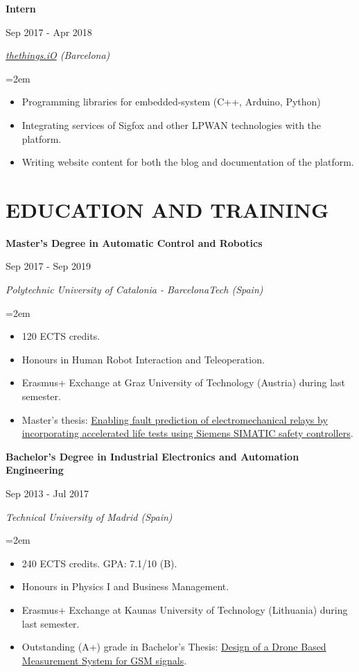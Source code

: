 \documentclass[10pt,a4paper,oneside]{book}
\newcommand{\sepspace}{\vspace*{0pt}}		%
\newcommand{\NewPart}[2]{\section*{\uppercase{#1} #2}}
\newcommand{\EducationEntrya}[4]{\noindent\ignorespaces	
		\begin{minipage}[t][][b]{0.8\textwidth} \raggedright{\textbf{#1}} \end{minipage} \hfill 
		\begin{minipage}[t][][b]{0.2\textwidth} \hfill\color{Black}#2\end{minipage} 
		 
		\noindent \textit{#3} \par        %
		\noindent\hangindent=2em\hangafter=0 \small #4 
		\normalsize \par}
\begin{document}
\EducationEntrya{Intern}{Sep 2017 - Apr 2018}{\href{https://thethings.io/}{thethings.iO} (Barcelona)}{\begin{itemize}
\item Programming libraries for embedded-system (C++, Arduino, Python)
\item Integrating services of Sigfox and other LPWAN technologies with the platform.
\item Writing website content for both the blog and  documentation of the platform. 
\end{itemize}}
\sepspace


\NewPart{Education and training}{}

\EducationEntrya{Master’s Degree in Automatic Control and Robotics }{Sep 2017 - Sep 2019}{Polytechnic University of Catalonia - BarcelonaTech (Spain)}{\begin{itemize}
\item 120 ECTS credits. %
\item Honours in Human Robot Interaction and Teleoperation.
\item Erasmus+ Exchange at Graz University of Technology (Austria) during last semester.
\item Master's thesis: \href{https://drive.google.com/file/d/1Iqn8KiqPcK-B8t8N4vIRxCtmRlIPhbDv/view?usp=sharing}{Enabling fault prediction of electromechanical relays by incorporating accelerated life tests using Siemens SIMATIC safety controllers}.
\end{itemize}}

\sepspace
\EducationEntrya{Bachelor's Degree in Industrial Electronics and Automation Engineering
\\}{Sep 2013 - Jul 2017}{Technical University of Madrid (Spain)}{\begin{itemize} \item 240 ECTS credits. GPA: 7.1/10 (B). \item Honours in Physics I and Business Management. 
\item Erasmus+ Exchange at Kaunas University of Technology (Lithuania) during last semester.
\item Outstanding (A+) grade in Bachelor's Thesis: \href{https://drive.google.com/open?id=1A6GAKAZvCmEC5OA4y8juzTmw9sQMJBd_}{Design of a Drone Based  Measurement System for GSM signals}.\end{itemize}}
\sepspace
\end{document}

